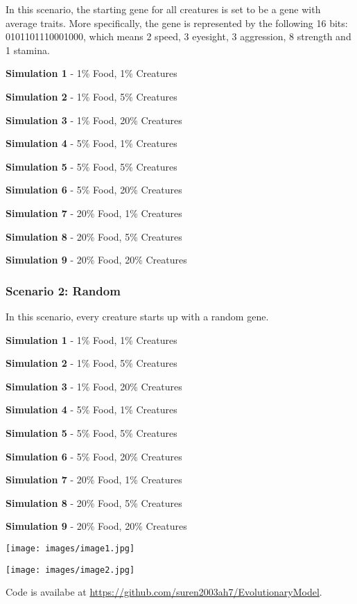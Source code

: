 \documentclass{article}
\begin{document}
In this scenario, the starting gene for all creatures is set to be a gene with average traits. More specifically, the gene is represented by the following 16 bits: 0101101110001000, which means 2 speed, 3 eyesight, 3 aggression, 8 strength and 1 stamina.

\textbf{Simulation 1} - 1\% Food, 1\% Creatures

\textbf{Simulation 2} - 1\% Food, 5\% Creatures

\textbf{Simulation 3} - 1\% Food, 20\% Creatures

\textbf{Simulation 4} - 5\% Food, 1\% Creatures

\textbf{Simulation 5} - 5\% Food, 5\% Creatures

\textbf{Simulation 6} - 5\% Food, 20\% Creatures

\textbf{Simulation 7} - 20\% Food, 1\% Creatures

\textbf{Simulation 8} - 20\% Food, 5\% Creatures

\textbf{Simulation 9} - 20\% Food, 20\% Creatures

\subsubsection{Scenario 2: Random}

In this scenario, every creature starts up with a random gene.

\textbf{Simulation 1} - 1\% Food, 1\% Creatures

\textbf{Simulation 2} - 1\% Food, 5\% Creatures

\textbf{Simulation 3} - 1\% Food, 20\% Creatures

\textbf{Simulation 4} - 5\% Food, 1\% Creatures

\textbf{Simulation 5} - 5\% Food, 5\% Creatures

\textbf{Simulation 6} - 5\% Food, 20\% Creatures

\textbf{Simulation 7} - 20\% Food, 1\% Creatures

\textbf{Simulation 8} - 20\% Food, 5\% Creatures

\textbf{Simulation 9} - 20\% Food, 20\% Creatures

\begin{center}
    \texttt{[image: images/image1.jpg]}
\end{center}
\begin{center}
    \texttt{[image: images/image2.jpg]}
\end{center}
Code is availabe at \href{https://github.com/suren2003ah7/EvolutionaryModel}{https://github.com/suren2003ah7/EvolutionaryModel}.
\end{document}
